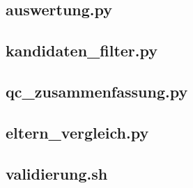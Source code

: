 \documentclass[10pt,a4paper,twocolumn]{article}
\begin{document}
\subsection*{auswertung.py}

\subsection*{kandidaten\_filter.py}

\subsection*{qc\_zusammenfassung.py}

\subsection*{eltern\_vergleich.py}

\subsection*{validierung.sh}

 


 
\end{document}
